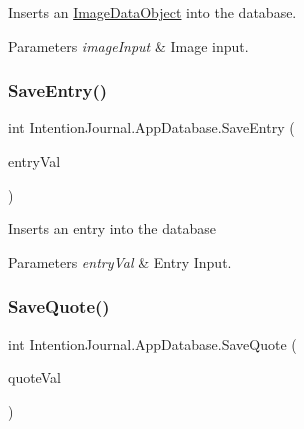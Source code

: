 Inserts an \hyperlink{class_intention_journal_1_1_image_data_object}{Image\+Data\+Object} into the database. 


\begin{DoxyParams}{Parameters}
{\em image\+Input} & Image input.\\
\hline
\end{DoxyParams}
\mbox{\label{class_intention_journal_1_1_app_database_a0fbfd4cc628dbd28e5628cc1194e64bb}} 
\subsubsection{\texorpdfstring{Save\+Entry()}{SaveEntry()}}
{\footnotesize\ttfamily int Intention\+Journal.\+App\+Database.\+Save\+Entry (\begin{DoxyParamCaption}\item[{\hyperlink{class_intention_journal_1_1_entry_object}{Entry\+Object}}]{entry\+Val }\end{DoxyParamCaption})\hspace{0.3cm}{\ttfamily [inline]}}



Inserts an entry into the database 


\begin{DoxyParams}{Parameters}
{\em entry\+Val} & Entry Input.\\
\hline
\end{DoxyParams}
\mbox{\label{class_intention_journal_1_1_app_database_a9beec77d3440f42c47bfe6592fb3107f}} 
\subsubsection{\texorpdfstring{Save\+Quote()}{SaveQuote()}}
{\footnotesize\ttfamily int Intention\+Journal.\+App\+Database.\+Save\+Quote (\begin{DoxyParamCaption}\item[{\hyperlink{class_intention_journal_1_1_quote_object}{Quote\+Object}}]{quote\+Val }\end{DoxyParamCaption})\hspace{0.3cm}{\ttfamily [inline]}}



